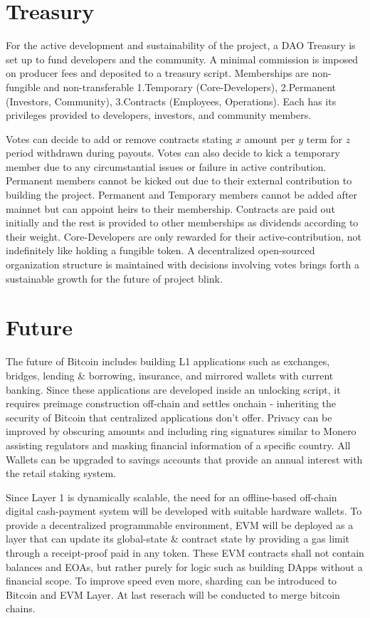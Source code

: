 \documentclass[a4paper,10pt]{article}
\begin{document}
\section{Treasury}
For the active development and sustainability of the project, a DAO Treasury is set up to fund developers and the community. A minimal commission is imposed on producer fees and deposited to a treasury script. Memberships are non-fungible and non-transferable 1.Temporary (Core-Developers), 2.Permanent (Investors, Community), 3.Contracts (Employees, Operations). Each has its privileges provided to developers, investors, and community members. 

Votes can decide to add or remove contracts stating $x$ amount per $y$ term for $z$ period withdrawn during payouts. Votes can also decide to kick a temporary member due to any circumstantial issues or failure in active contribution. Permanent members cannot be kicked out due to their external contribution to building the project. Permanent and Temporary members cannot be added after mainnet but can appoint heirs to their membership. Contracts are paid out initially and the rest is provided to other memberships as dividends according to their weight. Core-Developers are only rewarded for their active-contribution, not indefinitely like holding a fungible token. A decentralized open-sourced organization structure is maintained with decisions involving votes brings forth a sustainable growth for the future of project blink. 
\section{Future}

The future of Bitcoin includes building L1 applications such as exchanges, bridges, lending \& borrowing, insurance, and mirrored wallets with current banking. Since these applications are developed inside an unlocking script, it requires preimage construction off-chain and settles onchain - inheriting the security of Bitcoin that centralized applications don't offer. Privacy can be improved by obscuring amounts and including ring signatures similar to Monero assisting regulators and masking financial information of a specific country. All Wallets can be upgraded to savings accounts that provide an annual interest with the retail staking system.

Since Layer 1 is dynamically scalable, the need for an offline-based off-chain digital cash-payment system will be developed with suitable hardware wallets. To provide a decentralized programmable environment, EVM will be deployed as a layer that can update its global-state \& contract state by providing a gas limit through a receipt-proof paid in any token. These EVM contracts shall not contain balances and EOAs, but rather purely for logic such as building DApps without a financial scope. To improve speed even more, sharding can be introduced to Bitcoin and EVM Layer. At last reserach will be conducted to merge bitcoin chains.
\end{document}
